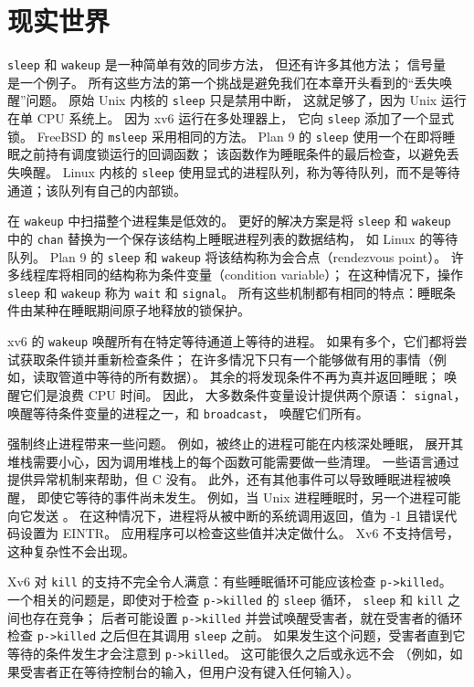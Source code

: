 \section{现实世界}

\lstinline{sleep}
和
\lstinline{wakeup}
是一种简单有效的同步方法，
但还有许多其他方法；
信号量~
\cite{dijkstra65}
是一个例子。
所有这些方法的第一个挑战是避免我们在本章开头看到的``丢失唤醒''问题。
原始 Unix 内核的
\lstinline{sleep}
只是禁用中断，
这就足够了，因为 Unix 运行在单 CPU 系统上。
因为 xv6 运行在多处理器上，
它向
\lstinline{sleep}
添加了一个显式锁。
FreeBSD 的
\lstinline{msleep}
采用相同的方法。
Plan 9 的
\lstinline{sleep}
使用一个在即将睡眠之前持有调度锁运行的回调函数；
该函数作为睡眠条件的最后检查，以避免丢失唤醒。
Linux 内核的
\lstinline{sleep}
使用显式的进程队列，称为等待队列，而不是等待通道；该队列有自己的内部锁。

在
\lstinline{wakeup}
中扫描整个进程集是低效的。
更好的解决方案是将
\lstinline{sleep}
和
\lstinline{wakeup}
中的
\lstinline{chan}
替换为一个保存该结构上睡眠进程列表的数据结构，
如 Linux 的等待队列。
Plan 9 的
\lstinline{sleep}
和
\lstinline{wakeup}
将该结构称为会合点（rendezvous point）。
许多线程库将相同的结构称为条件变量（condition variable）；
在这种情况下，操作
\lstinline{sleep}
和
\lstinline{wakeup}
称为
\lstinline{wait}
和
\lstinline{signal}。
所有这些机制都有相同的特点：睡眠条件由某种在睡眠期间原子地释放的锁保护。

xv6 的
\lstinline{wakeup}
唤醒所有在特定等待通道上等待的进程。
如果有多个，它们都将尝试获取条件锁并重新检查条件；
在许多情况下只有一个能够做有用的事情（例如，读取管道中等待的所有数据）。
其余的将发现条件不再为真并返回睡眠；
唤醒它们是浪费 CPU 时间。
因此，
大多数条件变量设计提供两个原语：
\lstinline{signal}，
唤醒等待条件变量的进程之一，和
\lstinline{broadcast}，
唤醒它们所有。

强制终止进程带来一些问题。
例如，被终止的进程可能在内核深处睡眠，
展开其堆栈需要小心，因为调用堆栈上的每个函数可能需要做一些清理。
一些语言通过提供异常机制来帮助，但 C 没有。
此外，还有其他事件可以导致睡眠进程被唤醒，
即使它等待的事件尚未发生。
例如，当 Unix 进程睡眠时，另一个进程可能向它发送
。
在这种情况下，进程将从被中断的系统调用返回，值为 -1 且错误代码设置为 EINTR。
应用程序可以检查这些值并决定做什么。
Xv6 不支持信号，这种复杂性不会出现。

Xv6 对
\lstinline{kill}
的支持不完全令人满意：有些睡眠循环可能应该检查
\lstinline{p->killed}。
一个相关的问题是，即使对于检查
\lstinline{p->killed}
的
\lstinline{sleep}
循环，
\lstinline{sleep}
和
\lstinline{kill}
之间也存在竞争；
后者可能设置
\lstinline{p->killed}
并尝试唤醒受害者，就在受害者的循环检查
\lstinline{p->killed}
之后但在其调用
\lstinline{sleep}
之前。
如果发生这个问题，受害者直到它等待的条件发生才会注意到
\lstinline{p->killed}。
这可能很久之后或永远不会
（例如，如果受害者正在等待控制台的输入，但用户没有键入任何输入）。

